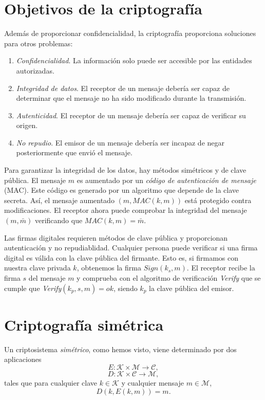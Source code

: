 \section{Objetivos de la criptografía}

Además de proporcionar confidencialidad, la criptografía proporciona soluciones para otros problemas:

\begin{enumerate}
    \item \emph{Confidencialidad}. La información solo puede ser accesible por las entidades autorizadas.
    \item \emph{Integridad de datos}. El receptor de un mensaje debería ser capaz de determinar que el mensaje no ha sido modificado durante la transmisión.
    \item \emph{Autenticidad}. El receptor de un mensaje debería ser capaz de verificar su origen.
    \item \emph{No repudio}. El emisor de un mensaje debería ser incapaz de negar posteriormente que envió el mensaje.
\end{enumerate}

Para garantizar la integridad de los datos, hay métodos simétricos y de clave pública. El mensaje $m$ es aumentado por un \emph{código de autenticación de mensaje} (MAC). Este código es generado por un algoritmo que depende de la clave secreta. Así, el mensaje aumentado $(m, MAC(k,m))$ está protegido contra modificaciones. El receptor ahora puede comprobar la integridad del mensaje $(m, \bar{m})$ verificando que $MAC(k, m) = \bar{m}$.

Las firmas digitales requieren métodos de clave pública y proporcionan autenticación y no repudiablidad. Cualquier persona puede verificar si una firma digital es válida con la clave pública del firmante. Esto es, si firmamos con nuestra clave privada $k$, obtenemos la firma $Sign(k_s, m)$. El receptor recibe la firma $s$ del mensaje $m$ y comprueba con el algoritmo de verificación \emph{Verify} que se cumple que \emph{Verify}$(k_p, s, m) = ok$, siendo $k_p$ la clave pública del emisor.

\section{Criptografía simétrica}

Un criptosistema \emph{simétrico}, como hemos visto, viene determinado por dos aplicaciones
\[
    E : \mathcal{K} \times \mathcal{M} \rightarrow \mathcal{C},
\]
\[
    D : \mathcal{K} \times \mathcal{C} \rightarrow \mathcal{M},
\]
tales que para cualquier clave $k \in \mathcal{K}$ y cualquier mensaje $m \in \mathcal{M}$,
\begin{equation}
    \label{def:criptosistema_simetrico}
    D(k, E(k, m)) = m.
\end{equation}


